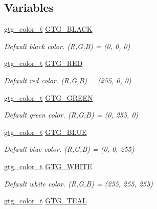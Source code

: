 \subsection*{Variables}
\begin{DoxyCompactItemize}
\item 
\hyperlink{GTGColor_8h_a7d118edf2d6e2588a0323079259fb0d6}{gtg\-\_\-color\-\_\-t} \hyperlink{group__GTGColor_gaa923f594cd6bf3da6a99d672c4438238}{G\-T\-G\-\_\-\-B\-L\-A\-C\-K}
\begin{DoxyCompactList}\small\item\em Default black color. (R,G,B) = (0, 0, 0) \end{DoxyCompactList}\item 
\hyperlink{GTGColor_8h_a7d118edf2d6e2588a0323079259fb0d6}{gtg\-\_\-color\-\_\-t} \hyperlink{group__GTGColor_ga64afa654e5f2102b76dfea9948fcc176}{G\-T\-G\-\_\-\-R\-E\-D}
\begin{DoxyCompactList}\small\item\em Default red color. (R,G,B) = (255, 0, 0) \end{DoxyCompactList}\item 
\hyperlink{GTGColor_8h_a7d118edf2d6e2588a0323079259fb0d6}{gtg\-\_\-color\-\_\-t} \hyperlink{group__GTGColor_gaac719b8d82b41edc0d2f29983222586a}{G\-T\-G\-\_\-\-G\-R\-E\-E\-N}
\begin{DoxyCompactList}\small\item\em Default green color. (R,G,B) = (0, 255, 0) \end{DoxyCompactList}\item 
\hyperlink{GTGColor_8h_a7d118edf2d6e2588a0323079259fb0d6}{gtg\-\_\-color\-\_\-t} \hyperlink{group__GTGColor_ga8ee0cf541a8cfe06ca0071bc12730514}{G\-T\-G\-\_\-\-B\-L\-U\-E}
\begin{DoxyCompactList}\small\item\em Default blue color. (R,G,B) = (0, 0, 255) \end{DoxyCompactList}\item 
\hyperlink{GTGColor_8h_a7d118edf2d6e2588a0323079259fb0d6}{gtg\-\_\-color\-\_\-t} \hyperlink{group__GTGColor_ga21ff1d892d73197f789eadfb5f53ae12}{G\-T\-G\-\_\-\-W\-H\-I\-T\-E}
\begin{DoxyCompactList}\small\item\em Default white color. (R,G,B) = (255, 255, 255) \end{DoxyCompactList}\item 
\hyperlink{GTGColor_8h_a7d118edf2d6e2588a0323079259fb0d6}{gtg\-\_\-color\-\_\-t} \hyperlink{group__GTGColor_gae5b393a4e0d57100e0809e25ccde762c}{G\-T\-G\-\_\-\-T\-E\-A\-L}

\end{DoxyCompactItemize}
